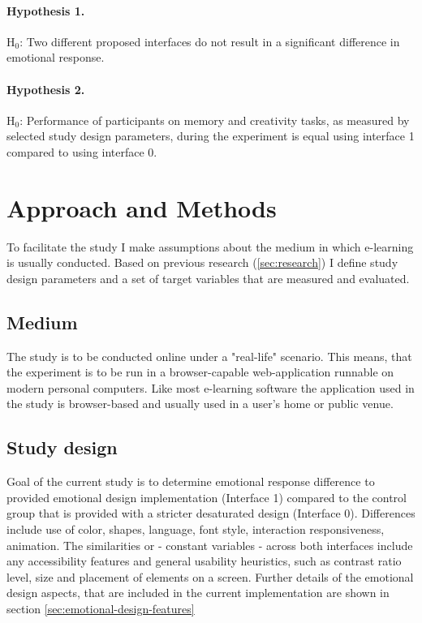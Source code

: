 		\paragraph{Hypothesis 1.} H$_{0}$: Two different proposed interfaces do not result in a significant difference in emotional response.
		
		\paragraph{Hypothesis 2.} H$_{0}$: Performance of participants on memory and creativity tasks, as measured by selected study design parameters, during the experiment is equal using interface 1 compared to using interface 0.

\section{Approach and Methods}

To facilitate the study I make assumptions about the medium in which e-learning is usually conducted. Based on previous research (\ref{sec:research}) I define study design parameters and a set of target variables that are measured and evaluated.

	\subsection{Medium}
	
	The study is to be conducted online under a "real-life" scenario. This means, that the experiment is to be run in a browser-capable web-application runnable on modern personal computers. Like most e-learning software the  application used in the study is browser-based and usually used in a user's home or public venue.
	
	\subsection{Study design} \label{sec:study-design}
	
	Goal of the current study is to determine emotional response difference to provided emotional design implementation (Interface 1) compared to the control group that is provided with a stricter desaturated design (Interface 0). Differences include use of color, shapes, language, font style, interaction responsiveness, animation. The similarities or - constant variables - across both interfaces include any accessibility features and general usability heuristics, such as contrast ratio level, size and placement of elements on a screen. Further details of the emotional design aspects, that are included in the current implementation are shown in section \ref{sec:emotional-design-features}
	
